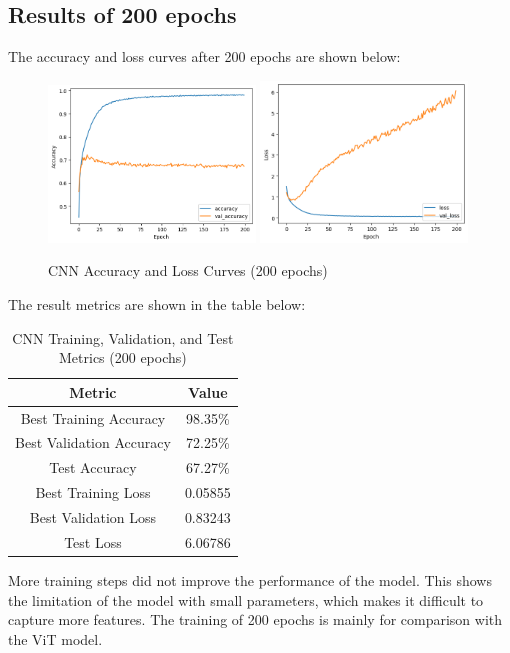 \documentclass[12pt]{article}
\begin{document}
\subsection{Results of 200 epochs}
The accuracy and loss curves after 200 epochs are shown below:
\begin{figure}[H]
    \centering
    \includegraphics[width=0.49\textwidth]{./src/cnn_accuracy_200.png}
    \includegraphics[width=0.49\textwidth]{./src/cnn_loss_200.png}
    \caption{CNN Accuracy and Loss Curves (200 epochs)}
\end{figure}
The result metrics are shown in the table below:
\begin{table}[H]
    \centering
    \begin{tabular}{c|c}
         \hline
            Metric & Value \\
            \hline
            Best Training Accuracy & 98.35\% \\
            Best Validation Accuracy & 72.25\% \\
            Test Accuracy & 67.27\% \\
            Best Training Loss & 0.05855 \\
            Best Validation Loss & 0.83243 \\
            Test Loss & 6.06786 \\
            \hline
    \end{tabular}
    \caption{CNN Training, Validation, and Test Metrics (200 epochs)}
\end{table}
More training steps did not improve the performance of the model.
This shows the limitation of the model with small parameters, which makes it difficult to capture more features.
The training of 200 epochs is mainly for comparison with the ViT model.
\end{document}
